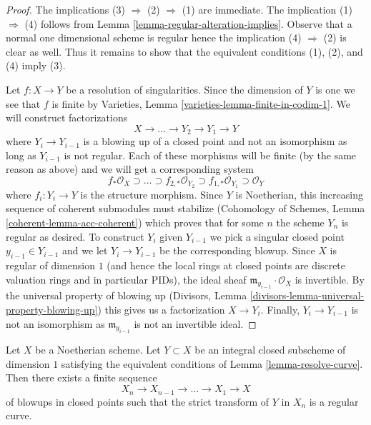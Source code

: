 \begin{proof}
The implications (3) $\Rightarrow$ (2) $\Rightarrow$ (1) are immediate.
The implication (1) $\Rightarrow$ (4) follows from
Lemma \ref{lemma-regular-alteration-implies}.
Observe that a normal one dimensional scheme is regular hence
the implication (4) $\Rightarrow$ (2) is clear as well.
Thus it remains to show that the equivalent conditions (1), (2), and
(4) imply (3).

\medskip\noindent
Let $f : X \to Y$ be a resolution of singularities. Since the dimension
of $Y$ is one we see that $f$ is finite by
Varieties, Lemma \ref{varieties-lemma-finite-in-codim-1}.
We will construct factorizations
$$
X \to \ldots \to Y_2 \to Y_1 \to Y
$$
where $Y_i \to Y_{i - 1}$ is a blowing up of a closed point and not
an isomorphism as long as $Y_{i - 1}$ is not regular.
Each of these morphisms will be finite (by the same
reason as above) and we will get a corresponding system
$$
f_*\mathcal{O}_X \supset \ldots \supset
f_{2, *}\mathcal{O}_{Y_2} \supset
f_{1, *}\mathcal{O}_{Y_1} \supset \mathcal{O}_Y
$$
where $f_i : Y_i \to Y$ is the structure morphism.
Since $Y$ is Noetherian, this increasing sequence of coherent submodules
must stabilize
(Cohomology of Schemes, Lemma \ref{coherent-lemma-acc-coherent})
which proves that for some $n$ the scheme $Y_n$ is regular
as desired. To construct $Y_i$ given $Y_{i - 1}$ we pick a singular
closed point $y_{i - 1} \in Y_{i - 1}$ and we let $Y_i \to Y_{i - 1}$
be the corresponding blowup. Since $X$ is regular of dimension $1$
(and hence the local rings at closed points are discrete valuation
rings and in particular PIDs), the ideal sheaf
$\mathfrak m_{y_{i - 1}} \cdot \mathcal{O}_X$ is invertible.
By the universal property of blowing up (Divisors, Lemma
\ref{divisors-lemma-universal-property-blowing-up})
this gives us a factorization
$X \to Y_i$.
Finally, $Y_i \to Y_{i - 1}$ is not an isomorphism as
$\mathfrak m_{y_{i - 1}}$ is not an invertible ideal.
\end{proof}

\begin{lemma}
\label{lemma-blowup-curve}
Let $X$ be a Noetherian scheme. Let $Y \subset X$ be an integral closed
subscheme of dimension $1$ satisfying the equivalent conditions of
Lemma \ref{lemma-resolve-curve}. Then there exists a finite sequence
$$
X_n \to X_{n - 1} \to \ldots \to X_1 \to X
$$
of blowups in closed points such that the strict transform of $Y$
in $X_n$ is a regular curve.
\end{lemma}

